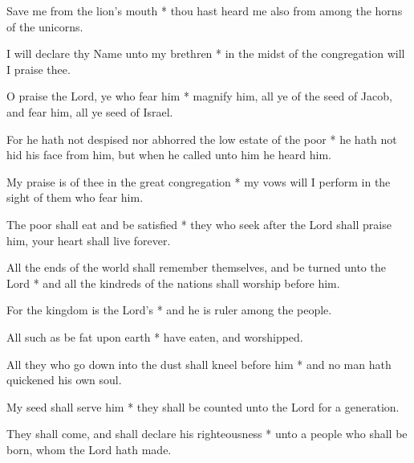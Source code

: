 Save me from the lion's mouth * thou hast heard me also from among the horns of the unicorns.

I will declare thy Name unto my brethren * in the midst of the congregation will I praise thee.

O praise the Lord, ye who fear him * magnify him, all ye of the seed of Jacob, and fear him, all ye seed of Israel.

For he hath not despised nor abhorred the low estate of the poor * he hath not hid his face from him, but when he called unto him he heard him.

My praise is of thee in the great congregation * my vows will I perform in the sight of them who fear him.

The poor shall eat and be satisfied * they who seek after the Lord shall praise him, your heart shall live forever.

All the ends of the world shall remember themselves, and be turned unto the Lord * and all the kindreds of the nations shall worship before him.

For the kingdom is the Lord's * and he is ruler among the people.

All such as be fat upon earth * have eaten, and worshipped.

All they who go down into the dust shall kneel before him * and no man hath quickened his own soul.

My seed shall serve him * they shall be counted unto the Lord for a generation.

They shall come, and shall declare his righteousness * unto a people who shall be born, whom the Lord hath made.